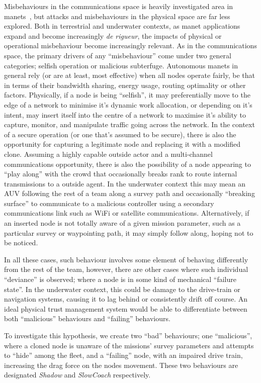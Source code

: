 Misbehaviours in the communications space is heavily investigated area in \glspl{manet}~\cite{Konate2011,Wang2009,Chen2014a,Mitchell2014}, but attacks and misbehaviours in the physical space are far less explored. 
Both in terrestrial and underwater contexts, as \gls{manet} applications expand and become increasingly \emph{de rigueur}, the impacts of physical or operational misbehaviour become increasingly relevant. 
As in the communications space, the primary drivers of any ``misbehaviour'' come under two general categories; selfish operation or malicious subterfuge.
Autonomous \glspl{manet} in general rely (or are at least, most effective) when all nodes operate fairly, be that in terms of their bandwidth sharing, energy usage, routing optimality or other factors. 
Physically, if a node is being ``selfish'', it may preferentially move to the edge of a network to minimise it's dynamic work allocation, or depending on it's intent, may insert itself into the centre of a network to maximise it's ability to capture, monitor, and manipulate traffic going across the network. 
In the context of a secure operation (or one that's assumed to be secure), there is also the opportunity for capturing a legitimate node and replacing it with a modified clone.
Assuming a highly capable outside actor and a multi-channel communications opportunity, there is also the possibility of a node appearing to ``play along'' with the crowd that occasionally breaks rank to route internal transmissions to a outside agent.
In the underwater context this may mean an AUV following the rest of a team along a survey path and occasionally ``breaking surface'' to communicate to a malicious controller using a secondary communications link such as WiFi or satellite communications.
Alternatively, if an inserted node is not totally aware of a given mission parameter, such as a particular survey or waypointing path, it may simply follow along, hoping not to be noticed.

In all these cases, such behaviour involves some element of behaving differently from the rest of the team, however, there are other cases where such individual ``deviance'' is observed; where a node is in some kind of mechanical ``failure state''.
In the underwater context, this could be damage to the drive-train or navigation systems, causing it to lag behind or consistently drift off course. 
An ideal physical trust management system would be able to differentiate between both ``malicious'' behaviours and ``failing'' behaviours.

To investigate this hypothesis, we create two ``bad'' behaviours; one ``malicious'', where a cloned node is unaware of the missions' survey parameters and attempts to ``hide'' among the fleet, and a ``failing'' node, with an impaired drive train, increasing the drag force on the nodes movement.
These two behaviours are designated \emph{Shadow} and \emph{SlowCoach} respectively.
\pagebreak

